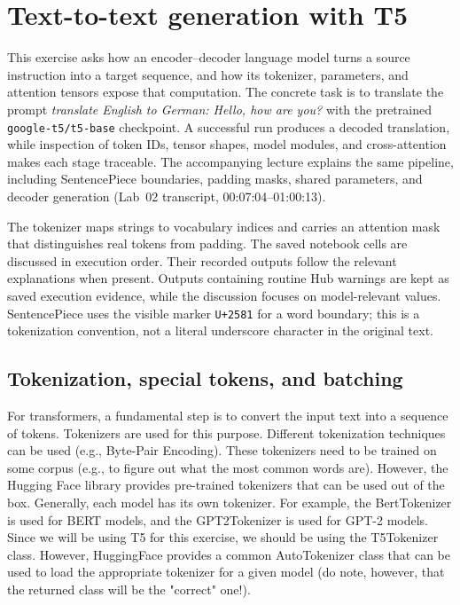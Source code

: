 \documentclass[../labs.tex]{subfiles}
\begin{document}
\chapter{Text-to-text generation with T5}

\label{ch:lab02_t5}


This exercise asks how an encoder--decoder language model turns a source instruction into a target sequence, and how its tokenizer, parameters, and attention tensors expose that computation. The concrete task is to translate the prompt \emph{translate English to German: Hello, how are you?} with the pretrained \texttt{google-t5/t5-base} checkpoint. A successful run produces a decoded translation, while inspection of token IDs, tensor shapes, model modules, and cross-attention makes each stage traceable. The accompanying lecture explains the same pipeline, including SentencePiece boundaries, padding masks, shared parameters, and decoder generation (Lab~02 transcript, 00:07:04--01:00:13).

The tokenizer maps strings to vocabulary indices and carries an attention mask that distinguishes real tokens from padding. The saved notebook cells are discussed in execution order. Their recorded outputs follow the relevant explanations when present. Outputs containing routine Hub warnings are kept as saved execution evidence, while the discussion focuses on model-relevant values. SentencePiece uses the visible marker \texttt{U+2581} for a word boundary; this is a tokenization convention, not a literal underscore character in the original text.

\section{Tokenization, special tokens, and batching}



\noindent For transformers, a fundamental step is to convert the input text into a sequence of tokens. Tokenizers are used for this purpose. Different tokenization techniques can be used (e.g., Byte-Pair Encoding). These tokenizers need to be trained on some corpus (e.g., to figure out what the most common words are). However, the Hugging Face library provides pre-trained tokenizers that can be used out of the box. Generally, each model has its own tokenizer. For example, the BertTokenizer is used for BERT models, and the GPT2Tokenizer is used for GPT-2 models. Since we will be using T5 for this exercise, we should be using the T5Tokenizer class. However, HuggingFace provides a common AutoTokenizer class that can be used to load the appropriate tokenizer for a given model (do note, however, that the returned class will be the "correct" one!).
\end{document}

